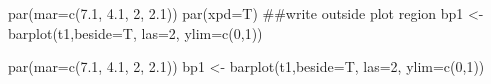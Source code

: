 \begin{Schunk}
\begin{Sinput}
 par(mar=c(7.1, 4.1, 2, 2.1))
 par(xpd=T) ##write outside plot region
 bp1 <- barplot(t1,beside=T, las=2, ylim=c(0,1))
\end{Sinput}
\end{Schunk}
\begin{Schunk}
\begin{Sinput}
 par(mar=c(7.1, 4.1, 2, 2.1))
 bp1 <- barplot(t1,beside=T, las=2, ylim=c(0,1))
\end{Sinput}
\end{Schunk}
